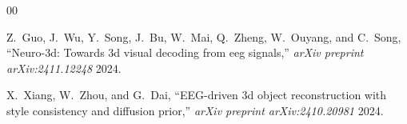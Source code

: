 \documentclass[conference]{IEEEtran}
\begin{document}
\begin{thebibliography}{00}





Z.~Guo, J.~Wu, Y.~Song, J.~Bu, W.~Mai, Q.~Zheng, W.~Ouyang, and C.~Song, ``Neuro-3d: Towards 3d visual decoding from eeg signals,'' {\em arXiv preprint arXiv:2411.12248} 2024.


X.~Xiang, W.~Zhou, and G.~Dai, ``EEG-driven 3d object reconstruction with style consistency and diffusion prior,'' {\em arXiv preprint arXiv:2410.20981} 2024.


\end{thebibliography}


\vspace{12pt}
\end{document}
